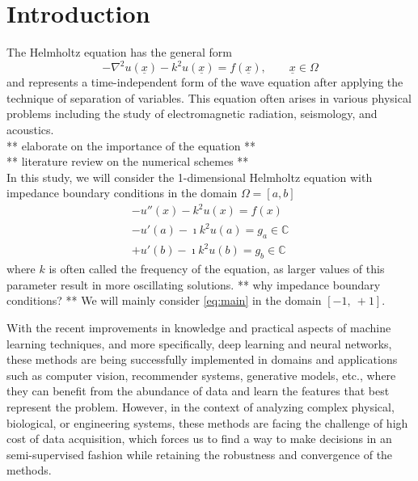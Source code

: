 \section{Introduction}

The Helmholtz equation has the general form
\begin{equation}
    \label{eq:general}
    -\nabla^2{u(\underline{x})} - k^2 u(\underline{x}) = f(\underline{x}), \qquad \underline{x} \in \Omega
\end{equation}
and represents a time-independent form of the wave equation after applying the technique of separation of variables.
This equation often arises in various physical problems including the study of electromagnetic radiation, seismology,
and acoustics.\\
** elaborate on the importance of the equation **\\
** literature review on the numerical schemes **\\

In this study, we will consider the 1-dimensional Helmholtz equation with impedance boundary conditions in the domain $\Omega=[a, b]$
\begin{equation}
    \label{eq:main}
    \begin{aligned}
        -u''(x) - k^2 u(x) = f(x)\\
        -u'(a) - \imath k^2 u(a) = g_a \in \mathbb{C}\\
        +u'(b) - \imath k^2 u(b) = g_b \in \mathbb{C}
    \end{aligned}
\end{equation}
where $k$ is often called the frequency of the equation, as larger values of this parameter result in more oscillating solutions.
** why impedance boundary conditions? **
We will mainly consider \autoref{eq:main} in the domain $[-1,\:+1]$.

With the recent improvements in knowledge and practical aspects of machine learning techniques, and more specifically,
deep learning and neural networks, these methods are being successfully implemented in domains and applications such as
computer vision, recommender systems, generative models, etc., where they can benefit from the abundance of data and
learn the features that best represent the problem.
However, in the context of analyzing complex physical, biological, or engineering systems, these methods are facing
the challenge of high cost of data acquisition, which forces us to find a way to make decisions in an semi-supervised
fashion while retaining the robustness and convergence of the methods.


